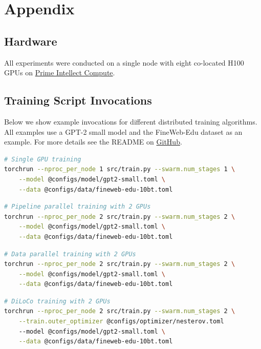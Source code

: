 \documentclass{article}
\newcommand{\github}{\href{https://github.com/mikasenghaas/diloco-swarm}{GitHub}}
\begin{document}
\section{Appendix}

\subsection{Hardware}

All experiments were conducted on a single node with eight co-located H100 GPUs
on \href{https://app.primeintellect.com/}{Prime Intellect Compute}.

\subsection{Training Script Invocations}

Below we show example invocations for different distributed training algorithms.
All examples use a GPT-2 small model and the FineWeb-Edu dataset as an example.
For more details see the README on \github.

\begin{lstlisting}[language=bash]
# Single GPU training
torchrun --nproc_per_node 1 src/train.py --swarm.num_stages 1 \
    --model @configs/model/gpt2-small.toml \
    --data @configs/data/fineweb-edu-10bt.toml
\end{lstlisting}

\begin{lstlisting}[language=bash]
# Pipeline parallel training with 2 GPUs
torchrun --nproc_per_node 2 src/train.py --swarm.num_stages 2 \
    --model @configs/model/gpt2-small.toml \
    --data @configs/data/fineweb-edu-10bt.toml
\end{lstlisting}

\begin{lstlisting}[language=bash]
# Data parallel training with 2 GPUs
torchrun --nproc_per_node 2 src/train.py --swarm.num_stages 2 \
    --model @configs/model/gpt2-small.toml \
    --data @configs/data/fineweb-edu-10bt.toml
\end{lstlisting}

\begin{lstlisting}[language=bash]
# DiLoCo training with 2 GPUs
torchrun --nproc_per_node 2 src/train.py --swarm.num_stages 2 \
    --train.outer_optimizer @configs/optimizer/nesterov.toml
    --model @configs/model/gpt2-small.toml \
    --data @configs/data/fineweb-edu-10bt.toml
\end{lstlisting}
\end{document}
